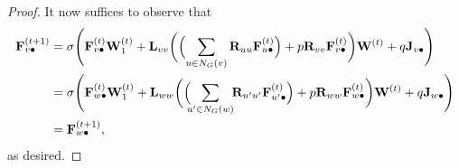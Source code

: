 \begin{proof}
%
  It now suffices to observe that
  \begin{align*}
	  \mathbf{F}^{(t+1)}_{v\bullet}&=\sigma\Biggl(\mathbf{F}^{(t)}_{v\bullet}\mathbf{W}_1^{(t)}+\mathbf{L}_{vv}\biggl(\Bigl(\sum_{u\in N_G(v)} \mathbf{R}_{uu}\mathbf{F}^{(t)}_{u\bullet}\Bigr)+p\mathbf{R}_{vv}\mathbf{F}^{(t)}_{v\bullet}\biggr)\mathbf{W}^{(t)}+ q\mathbf{J}_{v\bullet}\Biggr)\\
	 & =\sigma\Biggl(\mathbf{F}^{(t)}_{w\bullet}\mathbf{W}_1^{(t)}+\mathbf{L}_{ww}\biggl(\Bigl(\!\!\sum_{u'\in N_G(w)}\!\! \mathbf{R}_{u'u'}\mathbf{F}^{(t)}_{u'\bullet}\Bigr)+p\mathbf{R}_{ww}\mathbf{F}^{(t)}_{w\bullet}\biggr)\mathbf{W}^{(t)}+ q\mathbf{J}_{w\bullet}\Biggr)\\
	  &=\mathbf{F}^{(t+1)}_{w\bullet},
\end{align*}
as desired.
\end{proof}

